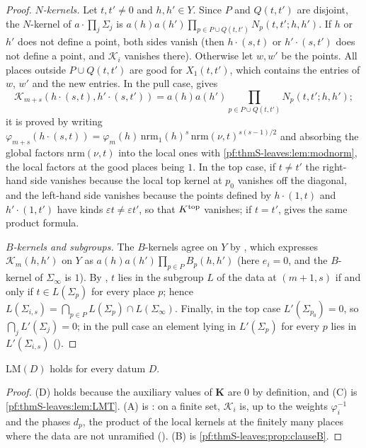 \begin{proof}
\emph{$N$-kernels.} Let $t,t'\ne0$ and $h,h'\in Y$. Since $P$ and $Q(t,t')$ are disjoint, the $N$-kernel of $a\cdot\prod_j\Sigma_j$ is
$a(h)a(h')\prod_{p\in P\cup Q(t,t')}N_p(t,t';h,h')$. If $h$ or $h'$ does not define a point, both sides vanish (then
$h\cdot(s,t)$ or $h'\cdot(s,t')$ does not define a point, and $\mathcal K_i$ vanishes there). Otherwise let $w,w'$ be the points. All
places outside $P\cup Q(t,t')$ are good for $X_1(t,t')$, which contains the entries of $w$, $w'$ and the new entries. In the pull case,
 gives
\[
\mathcal K_{m+s}(h\cdot(s,t),h'\cdot(s,t'))=a(h)a(h')\prod_{p\in P\cup Q(t,t')}N_p(t,t';h,h');
\]
it is proved by writing $\varphi_{m+s}(h\cdot(s,t))=\varphi_m(h)\,\mathrm{nrm}_1(h)^s\,\mathrm{nrm}(\nu,t)^{s(s-1)/2}$ and absorbing the global
factors $\mathrm{nrm}(\nu,t)$ into the local ones with \cref{pf:thmS-leaves:lem:modnorm}, the local factors at the good places being $1$.
In the top case, if $t\ne t'$ the right-hand side vanishes because the local top kernel at $p_0$ vanishes off the diagonal, and the
left-hand side vanishes because the points defined by $h\cdot(1,t)$ and $h'\cdot(1,t')$ have kinds $\varepsilon t\ne\varepsilon t'$, so that
$K^{\mathrm{top}}$ vanishes; if $t=t'$,  gives the same product formula.

\emph{$B$-kernels and subgroups.} The $B$-kernels agree on $Y$ by , which expresses
$\mathcal K_m(h,h')$ on $Y$ as $a(h)a(h')\prod_{p\in P}B_p(h,h')$ (here $e_i=0$, and the $B$-kernel of $\Sigma_\infty$ is $1$). By
, $t$ lies in the subgroup $L$ of the data at $(m+1,s)$ if and only if $t\in L(\Sigma_p)$ for
every place $p$; hence $L(\Sigma_{i,s})=\bigcap_{p\in P}L(\Sigma_p)\cap L(\Sigma_\infty)$. Finally, in the top case $L'(\Sigma_{p_0})=0$, so
$\bigcap_jL'(\Sigma_j)=0$; in the pull case an element lying in $L'(\Sigma_p)$ for every $p$ lies in $L'(\Sigma_{i,s})$
().
\end{proof}
\begin{proposition}\label{pf:thmS-leaves:prop:LM}
$\mathrm{LM}(D)$ holds for every datum $D$.
\end{proposition}

\begin{proof}
(D) holds because the auxiliary values of $\mathbf K$ are $0$ by definition, and (C) is \cref{pf:thmS-leaves:lem:LMT}. (A) is
: on a finite set, $\mathcal K_i$ is, up to the weights $\varphi_i^{-1}$ and the phases
$d_p$, the product of the local kernels at the finitely many places where the data are not unramified
(). (B) is \cref{pf:thmS-leaves:prop:clauseB}.
\end{proof}

